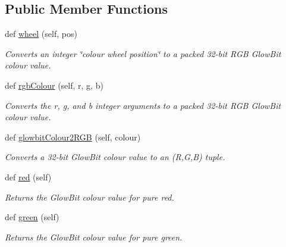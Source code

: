 \subsection*{Public Member Functions}
\begin{DoxyCompactItemize}
\item 
def \hyperlink{classglowbit_1_1colourFunctions_afb989958ec7aa4dfb7a04f359da5969a}{wheel} (self, pos)
\begin{DoxyCompactList}\small\item\em Converts an integer \char`\"{}colour wheel position\char`\"{} to a packed 32-\/bit R\+GB Glow\+Bit colour value. \end{DoxyCompactList}\item 
def \hyperlink{classglowbit_1_1colourFunctions_ad547ff80671bd310aac42051d81e6660}{rgb\+Colour} (self, r, g, b)
\begin{DoxyCompactList}\small\item\em Converts the r, g, and b integer arguments to a packed 32-\/bit R\+GB Glow\+Bit colour value. \end{DoxyCompactList}\item 
def \hyperlink{classglowbit_1_1colourFunctions_a6f887561ea3261440350ac3b1df4a259}{glowbit\+Colour2\+R\+GB} (self, colour)
\begin{DoxyCompactList}\small\item\em Converts a 32-\/bit Glow\+Bit colour value to an (R,G,B) tuple. \end{DoxyCompactList}\item 
\mbox{\label{classglowbit_1_1colourFunctions_a409c07eda953f09150f4ba67111f14e4}} 
def \hyperlink{classglowbit_1_1colourFunctions_a409c07eda953f09150f4ba67111f14e4}{red} (self)
\begin{DoxyCompactList}\small\item\em Returns the Glow\+Bit colour value for pure red. \end{DoxyCompactList}\item 
\mbox{\label{classglowbit_1_1colourFunctions_a822b37d8fa35cccd5ea9f2e0aa012435}} 
def \hyperlink{classglowbit_1_1colourFunctions_a822b37d8fa35cccd5ea9f2e0aa012435}{green} (self)
\begin{DoxyCompactList}\small\item\em Returns the Glow\+Bit colour value for pure green. \end{DoxyCompactList}\item 

\end{DoxyCompactItemize}
